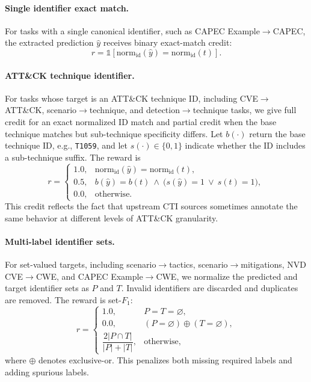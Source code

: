 \paragraph{Single identifier exact match.}
For tasks with a single canonical identifier, such as CAPEC Example$\rightarrow$CAPEC, the extracted prediction $\hat{y}$ receives binary exact-match credit:
\[
r
=
\mathbb{1}\!\left[
\mathrm{norm}_{\mathrm{id}}(\hat{y})
=
\mathrm{norm}_{\mathrm{id}}(t)
\right].
\]

\paragraph{ATT\&CK technique identifier.}
For tasks whose target is an ATT\&CK technique ID, including CVE$\rightarrow$ATT\&CK, scenario$\rightarrow$technique, and detection$\rightarrow$technique tasks, we give full credit for an exact normalized ID match and partial credit when the base technique matches but sub-technique specificity differs. Let $b(\cdot)$ return the base technique ID, e.g., \texttt{T1059}, and let $s(\cdot)\in\{0,1\}$ indicate whether the ID includes a sub-technique suffix. The reward is
\[
r =
\begin{cases}
1.0, &
\mathrm{norm}_{\mathrm{id}}(\hat{y})
=
\mathrm{norm}_{\mathrm{id}}(t),\\
0.5, &
b(\hat{y})=b(t)
\ \wedge\
\bigl(s(\hat{y})=1 \ \vee\ s(t)=1\bigr),\\
0.0, &
\text{otherwise.}
\end{cases}
\]
This credit reflects the fact that upstream CTI sources sometimes annotate the same behavior at different levels of ATT\&CK granularity.

\paragraph{Multi-label identifier sets.}
For set-valued targets, including scenario$\rightarrow$tactics, scenario$\rightarrow$mitigations, NVD CVE$\rightarrow$CWE, and CAPEC Example$\rightarrow$CWE, we normalize the predicted and target identifier sets as $P$ and $T$. Invalid identifiers are discarded and duplicates are removed. The reward is set-$F_1$:
\[
r =
\begin{cases}
1.0, & P=T=\varnothing,\\
0.0, & (P=\varnothing) \oplus (T=\varnothing),\\
\dfrac{2|P\cap T|}{|P|+|T|}, & \text{otherwise,}
\end{cases}
\]
where $\oplus$ denotes exclusive-or. This penalizes both missing required labels and adding spurious labels.

